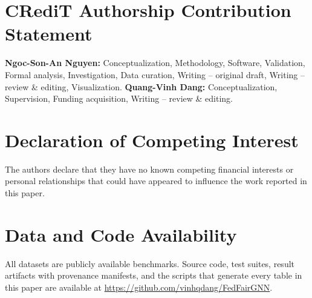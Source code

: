 \documentclass[preprint,12pt]{elsarticle}
\theoremstyle{plain}
\theoremstyle{definition}
\theoremstyle{remark}
\begin{document}
\section*{CRediT Authorship Contribution Statement}
\textbf{Ngoc-Son-An Nguyen:} Conceptualization, Methodology, Software, Validation, Formal analysis, Investigation, Data curation, Writing -- original draft, Writing -- review \& editing, Visualization.
\textbf{Quang-Vinh Dang:} Conceptualization, Supervision, Funding acquisition, Writing -- review \& editing.

\section*{Declaration of Competing Interest}
The authors declare that they have no known competing financial interests or personal relationships that could have appeared to influence the work reported in this paper.

\section*{Data and Code Availability}
All datasets are publicly available benchmarks. Source code, test suites, result artifacts with provenance manifests, and the scripts that generate every table in this paper are available at \url{https://github.com/vinhqdang/FedFairGNN}.



\end{document}
